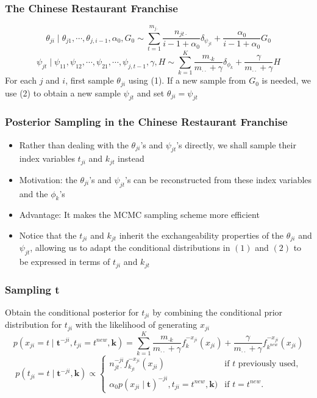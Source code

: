 \documentclass{beamer}
\begin{document}
	\begin{frame}
		\frametitle{The Chinese Restaurant Franchise}
		\begin{equation}
			\theta_{ji} \mid \theta_{j1},\cdots,\theta_{j,i-1},\alpha_0,G_0 \sim \sum_{t=1}^{m_{j\cdot}}\frac{n_{jt\cdot}}{i-1+\alpha_0}\delta_{\psi_{jt}} + \frac{\alpha_0}{i-1+\alpha_0}G_0
		\end{equation}
		\begin{equation}
			\psi_{jt} \mid \psi_{11},\psi_{12},\cdots,\psi_{21},\cdots,\psi_{j,t-1},\gamma,H \sim \sum_{k=1}^{K}\frac{m_{\cdot k}}{m_{\cdot \cdot}+\gamma}\delta_{\phi_{k}} + \frac{\gamma}{m_{\cdot \cdot}+\gamma}H
		\end{equation}
		For each $j$ and $i$, first sample $\theta_{ji}$ using (1). If a new sample from $G_0$ is needed, we use (2) to obtain a new sample $\psi_{jt}$ and set $\theta_{ji}=\psi_{jt}$
	\end{frame}
	\begin{frame}
		\frametitle{Posterior Sampling in the Chinese Restaurant Franchise}
		\begin{itemize}
			\item Rather than dealing with the $\theta_{ji}$'s and $\psi_{jt}$'s directly, we shall sample their index variables $t_{ji}$ and $k_{jt}$ instead
			\item Motivation: the $\theta_{ji}$'s and $\psi_{jt}$'s can be reconstructed from these index variables and the $\phi_k$'s
			\item Advantage: It makes the MCMC sampling scheme more efficient
			\item Notice that the $t_{ji}$ and $k_{jt}$ inherit the exchangeability properties of the $\theta_{ji}$ and $\psi_{jt}$, allowing us to adapt the conditional distributions in $(1)$ and $(2)$ to be expressed in terms of $t_{ji}$ and $k_{jt}$
		\end{itemize}
	\end{frame}
	\begin{frame}
		\frametitle{Sampling t}
		Obtain the conditional posterior for $t_{ji}$ by combining the conditional prior distribution for $t_{ji}$ with the likelihood of generating $x_{ji}$
		\begin{equation*}
			p(x_{ji}=t \mid \boldsymbol{t}^{-ji},t_{ji}=t^{new},\boldsymbol{k}) = \sum_{k=1}^{K}\frac{m_{\cdot k}}{m_{\cdot \cdot}+\gamma}f_k^{-x_{ji}}(x_{ji}) + \frac{\gamma}{m_{\cdot \cdot}+\gamma}f_{k^{new}}^{-x_{ji}}(x_{ji})
		\end{equation*}
		\begin{equation*}
			p(t_{ji}=t \mid \boldsymbol{t}^{-ji},\boldsymbol{k}) \propto
			\begin{cases}
				n_{jt\cdot}^{-ji}f_{k_{jt}}^{-x_{ji}}(x_{ji})& \text{if $t$ previously used,} \\
				\alpha_0p(x_{ji} \mid \boldsymbol{t})^{-ji},t_{ji}=t^{new},\boldsymbol{k})& \text{if $t=t^{new}$.}
			\end{cases}
		\end{equation*}
	\end{frame}
\end{document}
